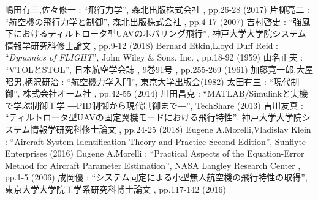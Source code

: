 
\begin{thebibliography}{99}


嶋田有三,佐々修一 : ``飛行力学'', 森北出版株式会社 , pp.26-28 (2017)
片柳亮二 : ``航空機の飛行力学と制御'', 森北出版株式会社 , pp.4-17 (2007)
吉村啓史 : ``強風下におけるティルトロータ型UAVのホバリング飛行'', 神戸大学大学院システム情報学研究科修士論文 , pp.9-12 (2018)
Bernard Etkin,Lloyd Duff Reid : ``\textit{Dynamics of FLIGHT}'', John Wiley & Sons. Inc. , pp.18-92 (1959)
山名正夫 : ``VTOLとSTOL'', 日本航空学会誌 , 9巻91号 , pp.255-269 (1961)
加藤寛一郎,大屋昭男,柄沢研治 : ``航空機力学入門'', 東京大学出版会(1982)
太田有三 : ``現代制御'', 株式会社オーム社 , pp.42-55 (2014)
川田昌克 : ``MATLAB/Simulinkと実機で学ぶ制御工学 ―PID制御から現代制御まで―'', TechShare (2013)
吉川友真 : ``ティルトロータ型UAVの固定翼機モードにおける飛行特性'', 神戸大学大学院システム情報学研究科修士論文 , pp.24-25 (2018)
Eugene A.Morelli,Vladislav Klein : ``Aircraft System Identification Theory and Practice Second Edition'', Sunflyte Enterprises (2016)
Eugene A.Morelli : ``Practical Aspects of the Equation-Error Method for Aircraft Parameter Estimation'', NASA Langley Research Center , pp.1-5 (2006)
成岡優 : ``システム同定による小型無人航空機の飛行特性の取得'', 東京大学大学院工学系研究科博士論文 , pp.117-142 (2016)

\end{thebibliography}

\newpage
